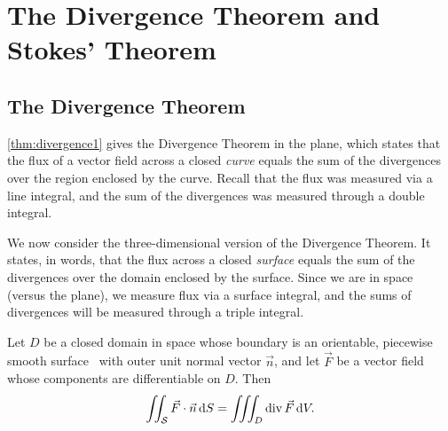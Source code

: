 \section{The Divergence Theorem and Stokes' Theorem}\label{sec:stokes_divergence}

\subsection{The Divergence Theorem}

\autoref{thm:divergence1} gives the Divergence Theorem in the plane, which states that the flux of a vector field across a closed \emph{curve} equals the sum of the divergences over the region enclosed by the curve. Recall that the flux was measured via a line integral, and the sum of the divergences was measured through a double integral.

We now consider the three-dimensional version of the Divergence Theorem. It states, in words, that the flux across a closed \emph{surface} equals the sum of the divergences over the domain enclosed by the surface. Since we are in space (versus the plane), we measure flux via a surface integral, and the sums of divergences will be measured through a triple integral.


\begin{theorem}\label{thm:divergence2}%
Let $D$ be a closed domain in space whose boundary is an orientable, piecewise smooth surface \surfaceS\ with outer unit normal vector $\vec n$, and let $\vec F$ be a vector field whose components are differentiable on $D$. Then
\[\iint_{\mathcal{S}} \vec F\cdot\vec n\operatorname{d}\! S =\iiint_D \operatorname{div} \vec F\operatorname{d}\! V.\]
\end{theorem}



